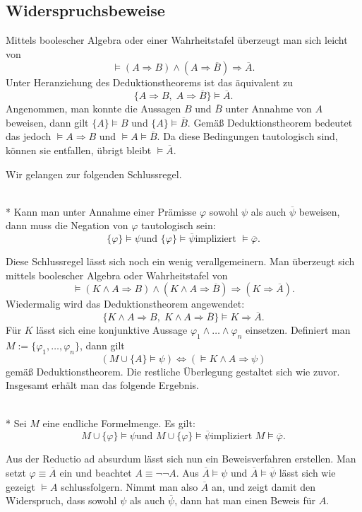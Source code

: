 \newpage
\subsection{Widerspruchsbeweise}
Mittels boolescher Algebra oder einer Wahrheitstafel überzeugt man
sich leicht von
\[\models (A\Rightarrow B)\land (A\Rightarrow\overline B)\Rightarrow\overline A.\]
Unter Heranziehung des Deduktionstheorems ist das äquivalent zu
\[\{A\Rightarrow B,\;A\Rightarrow\overline B\}\models\overline A.\]
Angenommen, man konnte die Aussagen $B$ und $\overline B$
unter Annahme von $A$ beweisen, dann gilt $\{A\}\models B$
und $\{A\}\models\overline B$. Gemäß Deduktionstheorem
bedeutet das jedoch $\models A\Rightarrow B$ und
$\models A\models\overline B$. Da diese Bedingungen tautologisch
sind, können sie entfallen, übrigt bleibt $\models\overline A$.

Wir gelangen zur folgenden Schlussregel.

\begin{Satz}\mbox{}\\*
Kann man unter Annahme einer Prämisse $\varphi$ sowohl
$\psi$ als auch $\overline\psi$ beweisen, dann muss
die Negation von $\varphi$ tautologisch sein:
\[\text{$\{\varphi\}\models\psi$
und $\{\varphi\}\models\overline\psi$
impliziert $\models\overline\varphi$}.\]
\end{Satz}

\noindent
Diese Schlussregel lässt sich noch ein wenig verallgemeinern.
Man überzeugt sich mittels boolescher Algebra oder Wahrheitstafel von
\[\models (K\land A\Rightarrow B)\land (K\land A\Rightarrow\overline B)
\Rightarrow (K\Rightarrow\overline A).\]
Wiedermalig wird das Deduktionstheorem angewendet:
\[\{K\land A\Rightarrow B,\;K\land A\Rightarrow\overline B\}
\models K\Rightarrow\overline A.\]
Für $K$ lässt sich eine konjunktive Aussage
$\varphi_1\land\ldots\land\varphi_n$ einsetzen.
Definiert man $M:=\{\varphi_1,\ldots,\varphi_n\}$, dann gilt
\[(M\cup\{A\}\models\psi)\iff (\models K\land A\Rightarrow\psi)\]
gemäß Deduktionstheorem. Die restliche Überlegung gestaltet
sich wie zuvor. Insgesamt erhält man das folgende Ergebnis.
\begin{Satz}\mbox{}\\*
Sei $M$ eine endliche Formelmenge. Es gilt:
\[\text{$M\cup\{\varphi\}\models\psi$
und $M\cup\{\varphi\}\models\overline\psi$
impliziert $M\models\overline\varphi$}.\]
\end{Satz}

\noindent
Aus der Reductio ad absurdum lässt sich nun ein
Beweisverfahren erstellen. Man setzt $\varphi\equiv\overline A$ ein
und beachtet $A\equiv\neg\neg A$. Aus $\overline A\models\psi$
und $\overline A\models\overline\psi$ lässt sich wie gezeigt
$\models A$ schlussfolgern. Nimmt man also $\overline A$ an,
und zeigt damit den Widerspruch, dass sowohl $\psi$ als auch
$\overline\psi$, dann hat man einen Beweis für $A$.

